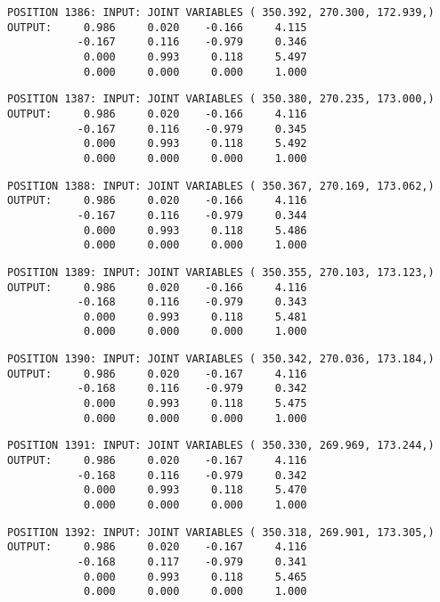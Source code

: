 \begin{verbatim}
POSITION 1386: INPUT: JOINT VARIABLES ( 350.392, 270.300, 172.939,)
OUTPUT:     0.986     0.020    -0.166     4.115
           -0.167     0.116    -0.979     0.346
            0.000     0.993     0.118     5.497
            0.000     0.000     0.000     1.000
\end{verbatim} \pagebreak[1]\begin{verbatim}
POSITION 1387: INPUT: JOINT VARIABLES ( 350.380, 270.235, 173.000,)
OUTPUT:     0.986     0.020    -0.166     4.116
           -0.167     0.116    -0.979     0.345
            0.000     0.993     0.118     5.492
            0.000     0.000     0.000     1.000
\end{verbatim} \pagebreak[1]\begin{verbatim}
POSITION 1388: INPUT: JOINT VARIABLES ( 350.367, 270.169, 173.062,)
OUTPUT:     0.986     0.020    -0.166     4.116
           -0.167     0.116    -0.979     0.344
            0.000     0.993     0.118     5.486
            0.000     0.000     0.000     1.000
\end{verbatim} \pagebreak[1]\begin{verbatim}
POSITION 1389: INPUT: JOINT VARIABLES ( 350.355, 270.103, 173.123,)
OUTPUT:     0.986     0.020    -0.166     4.116
           -0.168     0.116    -0.979     0.343
            0.000     0.993     0.118     5.481
            0.000     0.000     0.000     1.000
\end{verbatim} \pagebreak[1]\begin{verbatim}
POSITION 1390: INPUT: JOINT VARIABLES ( 350.342, 270.036, 173.184,)
OUTPUT:     0.986     0.020    -0.167     4.116
           -0.168     0.116    -0.979     0.342
            0.000     0.993     0.118     5.475
            0.000     0.000     0.000     1.000
\end{verbatim} \pagebreak[1]\begin{verbatim}
POSITION 1391: INPUT: JOINT VARIABLES ( 350.330, 269.969, 173.244,)
OUTPUT:     0.986     0.020    -0.167     4.116
           -0.168     0.116    -0.979     0.342
            0.000     0.993     0.118     5.470
            0.000     0.000     0.000     1.000
\end{verbatim} \pagebreak[1]\begin{verbatim}
POSITION 1392: INPUT: JOINT VARIABLES ( 350.318, 269.901, 173.305,)
OUTPUT:     0.986     0.020    -0.167     4.116
           -0.168     0.117    -0.979     0.341
            0.000     0.993     0.118     5.465
            0.000     0.000     0.000     1.000
\end{verbatim} \pagebreak[1]\begin{verbatim}

\end{verbatim}
